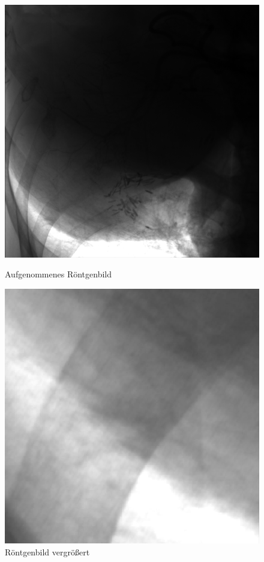 \documentclass[a4paper,12pt]{article}
\theoremstyle{definition}
\theoremstyle{remark}
\begin{document}
\begin{figure}[H]
  \centering
  \begin{minipage}{0.49\textwidth}
    \centering
    \includegraphics[width=\linewidth]{Bilder/original.png}
    \caption{Aufgenommenes Röntgenbild}
    \label{fig:bild1}
  \end{minipage}
  \hfill
  \begin{minipage}{0.49\textwidth}
    \centering
    \includegraphics[width=\linewidth]{Bilder/original_zoomed.png}
    \caption{Röntgenbild vergrößert}
    \label{fig:bild2}
  \end{minipage}
\end{figure}
\end{document}
